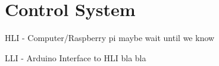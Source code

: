 \section{Control System}

HLI - Computer/Raspberry pi maybe wait until we know

LLI - Arduino Interface to HLI bla bla